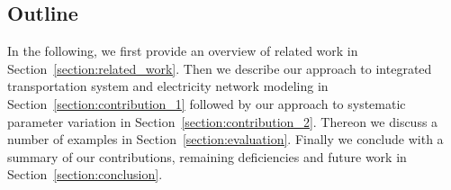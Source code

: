 \subsection{Outline}

In the following, we first provide an overview of related work in Section~\ref{section:related_work}. Then we describe our approach to integrated transportation system and electricity network modeling in Section~\ref{section:contribution_1} followed by our approach to systematic parameter variation in Section~\ref{section:contribution_2}. Thereon we discuss a number of examples in Section~\ref{section:evaluation}. Finally we conclude with a summary of our contributions, remaining deficiencies and future work in Section~\ref{section:conclusion}.